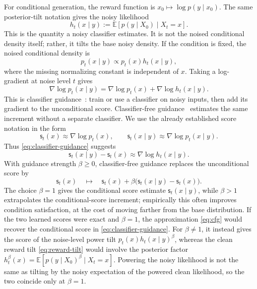 \documentclass[10pt,a4paper]{amsart}
\numberwithin{equation}{section}
\newcommand{\E}{\mathbb{E}}
\newcommand{\score}{\mathsf{s}}
\begin{document}
For conditional generation, the reward function is
$x_0\mapsto\log p(y\mid x_0)$.  The same posterior-tilt notation gives the noisy
likelihood
\[
    h_t(x\mid y)
    :=
    \E[p(y\mid X_0)\mid X_t=x].
\]
This is the quantity a noisy classifier estimates.  It is not the noised
conditional density itself; rather, it tilts the base noisy density.  If
the condition is fixed, the noised conditional density is
\[
    p_t(x\mid y)\propto p_t(x)h_t(x\mid y),
\]
where the missing normalizing constant is independent of $x$.  Taking a
log-gradient at noise level $t$ gives
\begin{equation}\label{eq:classifier-guidance}
    \nabla\log p_t(x\mid y)
    =
    \nabla\log p_t(x)
    +
    \nabla\log h_t(x\mid y).
\end{equation}
This is classifier guidance~\cite{dhariwal2021guidance}: train or use a
classifier on noisy inputs, then add its gradient to the unconditional score.
Classifier-free guidance~\cite{ho2022cfg} estimates the same increment without
a separate classifier.  We use the already established score notation in the
form
\[
    \score_t(x)\approx\nabla\log p_t(x),
    \qquad
    \score_t(x\mid y)\approx\nabla\log p_t(x\mid y).
\]
Thus \eqref{eq:classifier-guidance} suggests
\[
    \score_t(x\mid y)-\score_t(x)
    \approx
    \nabla\log h_t(x\mid y).
\]
With guidance strength $\beta\geq0$, classifier-free guidance replaces the
unconditional score by
\begin{equation}\label{eq:cfg}
    \score_t(x)
    \quad\longmapsto\quad
    \score_t(x)
    +
    \beta\bigl(\score_t(x\mid y)-\score_t(x)\bigr).
\end{equation}
The choice $\beta=1$ gives the conditional score estimate $\score_t(x\mid y)$, while
$\beta>1$ extrapolates the conditional-score increment; empirically this often
improves condition satisfaction, at the cost of moving farther from the base
distribution.
If the two learned scores were exact and $\beta=1$, the approximation \eqref{eq:cfg}
would recover the conditional score in \eqref{eq:classifier-guidance}.  For
$\beta\neq1$, it instead gives the score of the noise-level power tilt
$p_t(x)h_t(x\mid y)^\beta$, whereas the clean reward tilt
\eqref{eq:reward-tilt} would involve the posterior factor
$h_t^\beta(x)=\E[p(y\mid X_0)^\beta\mid X_t=x]$.  Powering the noisy likelihood is
not the same as tilting by the noisy expectation of the powered clean
likelihood, so the two coincide only at $\beta=1$.
\end{document}

